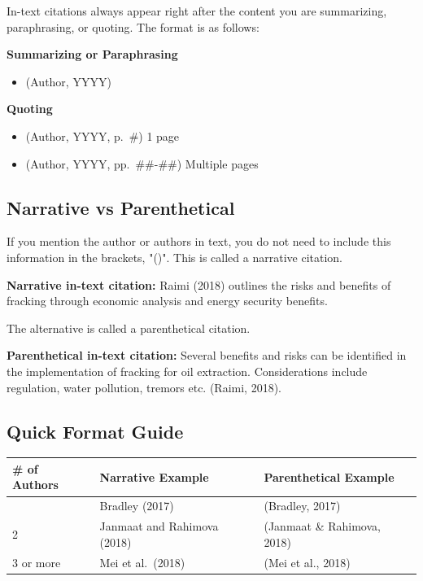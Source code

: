 \documentclass[
]{book}
\newcounter{none} %
\providecommand{\tightlist}{%
  \setlength{\itemsep}{0pt}\setlength{\parskip}{0pt}}
\begin{document}
In-text citations always appear right after the content you are summarizing, paraphrasing, or quoting. The format is as follows:

\textbf{Summarizing or Paraphrasing}

\begin{itemize}
\tightlist
\item
  (Author, YYYY)
\end{itemize}

\textbf{Quoting}

\begin{itemize}
\tightlist
\item
  (Author, YYYY, p.~\#) 1 page
\item
  (Author, YYYY, pp.~\#\#-\#\#) Multiple pages
\end{itemize}

\subsection*{Narrative vs Parenthetical}\label{narrative-vs-parenthetical}

If you mention the author or authors in text, you do not need to include this information in the brackets, "()". This is called a narrative citation.

\textbf{Narrative in-text citation:} Raimi (2018) outlines the risks and benefits of fracking through economic analysis and energy security benefits.

The alternative is called a parenthetical citation.

\textbf{Parenthetical in-text citation:} Several benefits and risks can be identified in the implementation of fracking for oil extraction. Considerations include regulation, water pollution, tremors etc. (Raimi, 2018).

\subsection*{Quick Format Guide}\label{quick-format-guide}

{\def\LTcaptype{none} %
\begin{longtable}[]{@{}lll@{}}
\toprule\noalign{}
\# of Authors & Narrative Example & Parenthetical Example \\
\midrule\noalign{}
\endhead
\bottomrule\noalign{}
\endlastfoot
1 & Bradley (2017) & (Bradley, 2017) \\
2 & Janmaat and Rahimova (2018) & (Janmaat \& Rahimova, 2018) \\
3 or more & Mei et al.~(2018) & (Mei et al., 2018) \\
\end{longtable}
}
\end{document}
